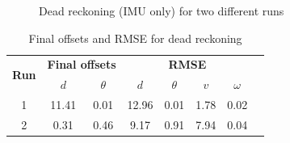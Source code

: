 \documentclass[10pt,a4paper, twocolumn]{article}
\begin{document}
\begin{figure}[h]
	\centering
	\newline
	\caption{Dead reckoning (IMU only) for two different runs}
	\label{fig:dead_reckoning}
\end{figure}

\begin{table}[h]
	\begin{center}
		\begin{tabular}{|c|c|c|c|c|c|c|c|}
			\hline
			\multirow{2}{*}{\textbf{Run}} & \multicolumn{2}{c|}{\textbf{Final offsets}} &  \multicolumn{4}{c|}{\textbf{RMSE}} \\ \cline{2-7}
			  & $d$ & $\theta$ & $d$ & $\theta$ & $v$ & $\omega$ \\ \hline
			1 & 11.41 & 0.01 & 12.96 & 0.01 & 1.78 & 0.02 \\
			2 & 0.31 & 0.46 & 9.17 & 0.91 & 7.94 & 0.04 \\
			\hline
			
		\end{tabular}
		\caption{Final offsets and RMSE for dead reckoning}
		\label{table:dead_reckoning}
	\end{center}	
\end{table}
\end{document}
